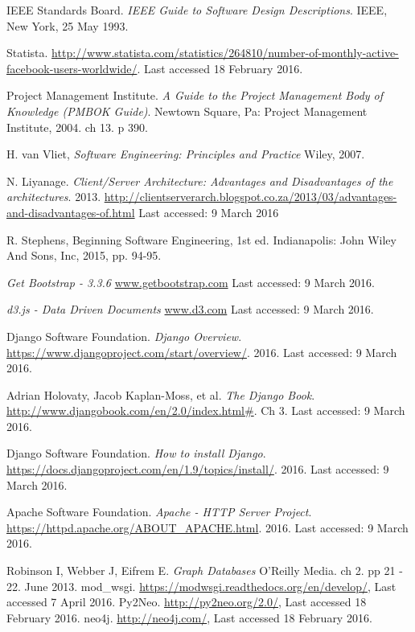 \documentclass[12pt,onecolumn]{article}
\begin{document}
	
	\begin{thebibliography}{1}
		 IEEE Standards Board. \emph{IEEE Guide to Software Design Descriptions}. IEEE, New York, 25 May 1993.
		
		 Statista. \url {http://www.statista.com/statistics/264810/number-of-monthly-active-facebook-users-worldwide/}. Last accessed 18 February 2016. 
		
		 Project Management Institute. \emph{A Guide to the Project Management Body of Knowledge (PMBOK Guide)}. Newtown Square, Pa: Project Management Institute, 2004. ch 13. p 390.
		
		 H. van Vliet, \emph{Software Engineering: Principles and Practice} Wiley, 2007.
		
		 N. Liyanage. \emph{Client/Server Architecture: Advantages and Disadvantages of the architectures}. 2013. \url{http://clientserverarch.blogspot.co.za/2013/03/advantages-and-disadvantages-of.html} Last accessed: 9 March 2016
		
		 R. Stephens, Beginning Software Engineering, 1st ed. Indianapolis: John Wiley And Sons, Inc, 2015, pp. 94-95.
		
		  \emph{Get Bootstrap - 3.3.6} \url{www.getbootstrap.com} Last accessed: 9 March 2016.
		
		  \emph{d3.js - Data Driven Documents} \url{www.d3.com} Last accessed: 9 March 2016.
		
		 Django Software Foundation. \emph{Django Overview}. \url{https://www.djangoproject.com/start/overview/}. 2016. Last accessed: 9 March 2016. 
		
		 Adrian Holovaty, Jacob Kaplan-Moss, et al. \emph{The Django Book}. \url{http://www.djangobook.com/en/2.0/index.html#}. Ch 3. Last accessed: 9 March 2016.
		
		 Django Software Foundation. \emph{How to install Django}. \url{https://docs.djangoproject.com/en/1.9/topics/install/}. 2016. Last accessed: 9 March 2016.	
		
		 Apache Software Foundation. \emph{Apache - HTTP Server Project}. \url{https://httpd.apache.org/ABOUT_APACHE.html}. 2016. Last accessed: 9 March 2016.	
		
		 Robinson I, Webber J, Eifrem E. \emph{Graph Databases} O'Reilly Media. ch 2. pp 21 - 22. June 2013.
		 mod\_wsgi. \url{https://modwsgi.readthedocs.org/en/develop/}, Last accessed 7 April 2016.
		 Py2Neo. \url{http://py2neo.org/2.0/}, Last accessed 18 February 2016.
		 neo4j. \url{http://neo4j.com/}, Last accessed 18 February 2016.
		

\end{thebibliography}
\end{document}
